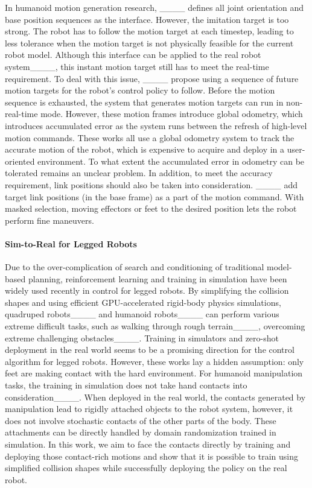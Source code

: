 In humanoid motion generation research, ____ defines all joint orientation and base position sequences as the interface. However, the imitation target is too strong. The robot has to follow the motion target at each timestep, leading to less tolerance when the motion target is not physically feasible for the current robot model. Although this interface can be applied to the real robot system____, this instant motion target still has to meet the real-time requirement. To deal with this issue, ____ propose using a sequence of future motion targets for the robot's control policy to follow. Before the motion sequence is exhausted, the system that generates motion targets can run in non-real-time mode. However, these motion frames introduce global odometry, which introduces accumulated error as the system runs between the refresh of high-level motion commands. These works all use a global odometry system to track the accurate motion of the robot, which is expensive to acquire and deploy in a user-oriented environment. To what extent the accumulated error in odometry can be tolerated remains an unclear problem. In addition, to meet the accuracy requirement, link positions should also be taken into consideration. ____ add target link positions (in the base frame) as a part of the motion command. With masked selection, moving effectors or feet to the desired position lets the robot perform fine maneuvers. 


\paragraph{Sim-to-Real for Legged Robots}
Due to the over-complication of search and conditioning of traditional model-based planning, reinforcement learning and training in simulation have been widely used recently in control for legged robots. By simplifying the collision shapes and using efficient GPU-accelerated rigid-body physics simulations, quadruped robots____ and humanoid robots____ can perform various extreme difficult tasks, such as walking through rough terrain____, overcoming extreme challenging obstacles____. Training in simulators and zero-shot deployment in the real world seems to be a promising direction for the control algorithm for legged robots. However, these works lay a hidden assumption: only feet are making contact with the hard environment. For humanoid manipulation tasks, the training in simulation does not take hand contacts into consideration____. When deployed in the real world, the contacts generated by manipulation lead to rigidly attached objects to the robot system, however, it does not involve stochastic contacts of the other parts of the body. These attachments can be directly handled by domain randomization trained in simulation. In this work, we aim to face the contacts directly by training and deploying those contact-rich motions and show that it is possible to train using simplified collision shapes while successfully deploying the policy on the real robot.